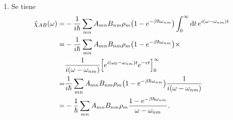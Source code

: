 \documentclass{article}
\begin{document}
\begin{enumerate}
\item Se tiene
\begin{align}
\begin{split}
\hat{\chi}_{AB}(\omega)=&-\frac{1}{i\hbar}\sum_{mn}A_{mn}B_{nm}\rho_m\qty(1-e^{-\beta\hbar\omega_{nm}})\int_0^\infty\dd{t}e^{i(\omega-\omega_{nm})t}\\
=&-\frac{1}{i\hbar}\sum_{mn}A_{mn}B_{nm}\rho_m\qty(1-e^{-\beta\hbar\omega_{nm}})\times\\
&\frac{1}{i(\omega-\omega_{nm})}\qty[e^{i(\omega_0-\omega_{nm})t}e^{-\epsilon t}]_0^\infty\\
=&\frac{1}{i\hbar}\sum_{mn}A_{mn}B_{nm}\rho_m\qty(1-e^{-\beta\hbar\omega_{nm}})\frac{1}{i(\omega-\omega_{nm})}\\
=&-\frac{1}{\hbar}\sum_{mn}A_{mn}B_{nm}\rho_m\frac{1-e^{-\beta\hbar\omega_{nm}}}{\omega-\omega_{nm}}.
\end{split}
\end{align}


\end{enumerate}
\end{document}

